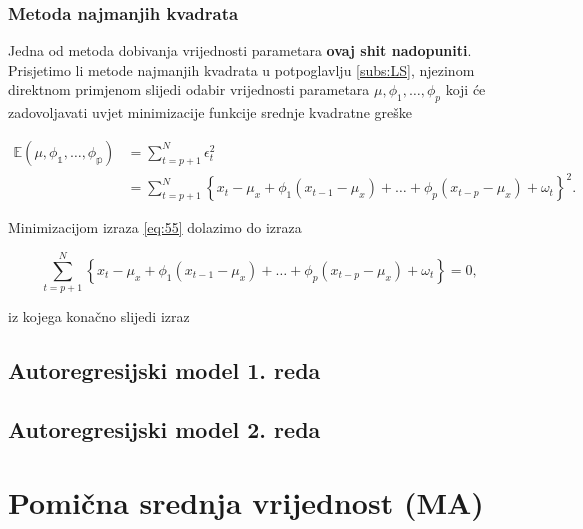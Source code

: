 \documentclass[a4paper,12pt,oneside]{memoir}
\begin{document}
            \subsubsection{Metoda najmanjih kvadrata}

            Jedna od metoda dobivanja vrijednosti parametara \textbf{ovaj shit nadopuniti}. Prisjetimo li metode najmanjih kvadrata u potpoglavlju \ref{subs:LS}, njezinom direktnom primjenom slijedi odabir vrijednosti parametara $\mu,\phi_1,\ldots,\phi_p$ koji će zadovoljavati uvjet minimizacije funkcije srednje kvadratne greške
            
            \begin{equation}
                \begin{split}
                    \mathbb{E(\mu,\phi_1,\ldots,\phi_p)}&=\displaystyle\sum_{t=p+1}^N\epsilon_t^2\\
                    & =\displaystyle\sum_{t=p+1}^N\left\{x_t-\mu_x+\phi_1\left(x_{t-1}-\mu_x\right)+\ldots+\phi_p\left(x_{t-p}-\mu_x\right)+\omega_t\right\}^2.
                \end{split}
                \label{eq:58}
            \end{equation}

            Minimizacijom izraza \ref{eq:55} dolazimo do izraza
            
            \begin{equation}
                \displaystyle\sum_{t=p+1}^N\left\{x_t-\mu_x+\phi_1\left(x_{t-1}-\mu_x\right)+\ldots+\phi_p\left(x_{t-p}-\mu_x\right)+\omega_t\right\}=0,
            \end{equation}
            \label{subs:511}

            iz kojega konačno slijedi izraz


            \subsection{Autoregresijski model 1. reda}
            \label{subs:512}
            \subsection{Autoregresijski model 2. reda}
            \label{subs:513}




        \section{Pomična srednja vrijednost (MA)}
\end{document}
